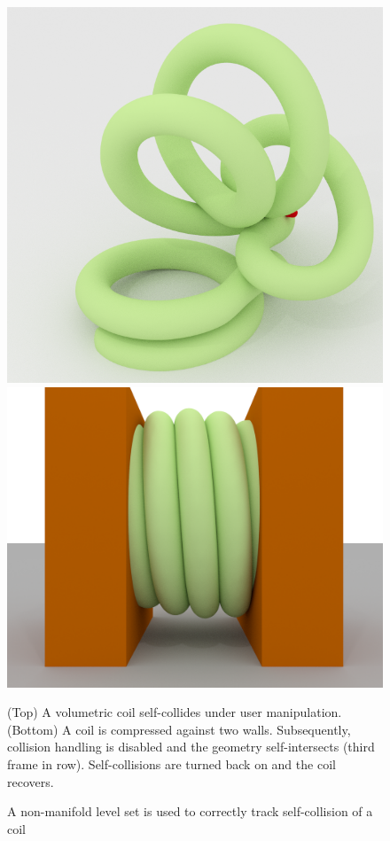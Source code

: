 \begin{figure}
{\includegraphics[height=.2\paperheight]{chapter_nonmanifoldlevelsets/images/coil_100.png}
\hfill
\includegraphics[height=.2\paperheight]{chapter_nonmanifoldlevelsets/images/compression_060.png}
}

\vspace*{-.1in}
\caption{A non-manifold level set is used to correctly track
  self-collision of a coil}{(Top) A volumetric coil self-collides
  under user manipulation. (Bottom) A coil is compressed against two
  walls. Subsequently, collision handling is disabled and the geometry
  self-intersects (third frame in row). Self-collisions are turned
  back on and the coil recovers.}
\label{fig:coil}
\vspace*{-.15in}
\end{figure}


